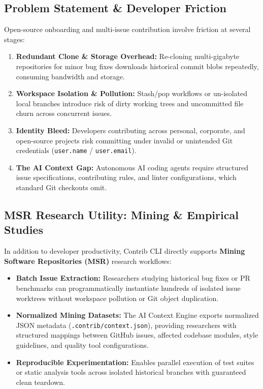 \documentclass[10pt,conference]{IEEEtran}
\begin{document}
\subsection{Problem Statement \& Developer Friction}
Open-source onboarding and multi-issue contribution involve friction at several stages:
\begin{enumerate}
    \item \textbf{Redundant Clone \& Storage Overhead:} Re-cloning multi-gigabyte repositories for minor bug fixes downloads historical commit blobs repeatedly, consuming bandwidth and storage.
    \item \textbf{Workspace Isolation \& Pollution:} Stash/pop workflows or un-isolated local branches introduce risk of dirty working trees and uncommitted file churn across concurrent issues.
    \item \textbf{Identity Bleed:} Developers contributing across personal, corporate, and open-source projects risk committing under invalid or unintended Git credentials (\texttt{user.name} / \texttt{user.email}).
    \item \textbf{The AI Context Gap:} Autonomous AI coding agents require structured issue specifications, contributing rules, and linter configurations, which standard Git checkouts omit.
\end{enumerate}

\subsection{MSR Research Utility: Mining \& Empirical Studies}
In addition to developer productivity, Contrib CLI directly supports \textbf{Mining Software Repositories (MSR)} research workflows:
\begin{itemize}
    \item \textbf{Batch Issue Extraction:} Researchers studying historical bug fixes or PR benchmarks can programmatically instantiate hundreds of isolated issue worktrees without workspace pollution or Git object duplication.
    \item \textbf{Normalized Mining Datasets:} The AI Context Engine exports normalized JSON metadata (\texttt{.contrib/context.json}), providing researchers with structured mappings between GitHub issues, affected codebase modules, style guidelines, and quality tool configurations.
    \item \textbf{Reproducible Experimentation:} Enables parallel execution of test suites or static analysis tools across isolated historical branches with guaranteed clean teardown.
\end{itemize}
\end{document}
